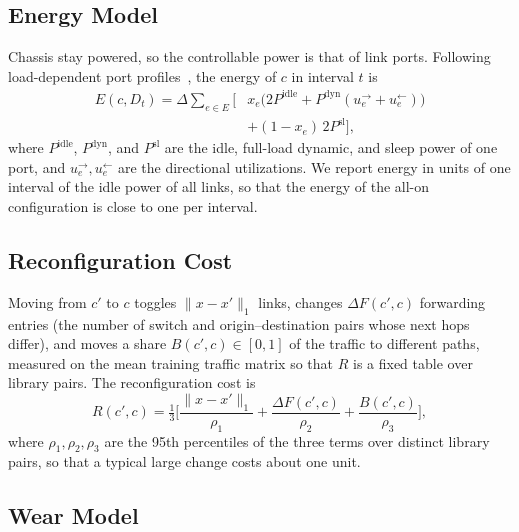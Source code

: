\documentclass[journal]{IEEEtran}
\begin{document}
\subsection{Energy Model}

Chassis stay powered, so the controllable power is that of link ports. Following load-dependent port profiles~\cite{restrepo2009energy,mahadevan2009power,vishwanath2014modeling}, the energy of $c$ in interval $t$ is
\begin{equation}\label{eq:energy}
\begin{split}E(c,D_t)=\Delta\sum_{e\in E}\Big[&x_e\big(2P^{\mathrm{idle}}+P^{\mathrm{dyn}}(u_e^{\rightarrow}+u_e^{\leftarrow})\big)\\
&+(1-x_e)\,2P^{\mathrm{sl}}\Big],\end{split}
\end{equation}
where $P^{\mathrm{idle}}$, $P^{\mathrm{dyn}}$, and $P^{\mathrm{sl}}$ are the idle, full-load dynamic, and sleep power of one port, and $u_e^{\rightarrow},u_e^{\leftarrow}$ are the directional utilizations. We report energy in units of one interval of the idle power of all links, so that the energy of the all-on configuration is close to one per interval.

\subsection{Reconfiguration Cost}

Moving from $c'$ to $c$ toggles $\|x-x'\|_1$ links, changes $\Delta F(c',c)$ forwarding entries (the number of switch and origin--destination pairs whose next hops differ), and moves a share $B(c',c)\in[0,1]$ of the traffic to different paths, measured on the mean training traffic matrix so that $R$ is a fixed table over library pairs. The reconfiguration cost is
\begin{equation}\label{eq:reconf}
R(c',c)=\tfrac13\Big[\frac{\|x-x'\|_1}{\rho_1}+\frac{\Delta F(c',c)}{\rho_2}+\frac{B(c',c)}{\rho_3}\Big],
\end{equation}
where $\rho_1,\rho_2,\rho_3$ are the 95th percentiles of the three terms over distinct library pairs, so that a typical large change costs about one unit.

\subsection{Wear Model}
\end{document}
